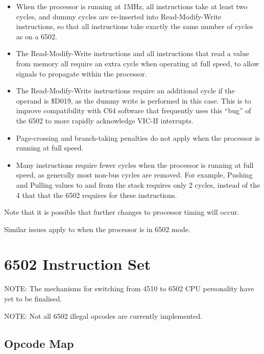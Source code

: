 \begin{itemize}
\item When the processor is running at 1MHz, all instructions take at least
  two cycles, and dummy cycles are re-inserted into Read-Modify-Write instructions,
  so that all instructions take exactly the same number of cycles as on a 6502.
\item The Read-Modify-Write instructions and all instructions that read a value from
  memory all require an extra cycle when operating at full speed, to allow signals
  to propagate within the processor.
\item The Read-Modify-Write instructions require an additional cycle if the operand
  is \$D019, as the dummy write is performed in this case.
  This is to improve compatibility with C64 software that frequently uses this
  ``bug'' of the 6502 to more rapidly acknowledge VIC-II interrupts.
\item Page-crossing and branch-taking penalties do not apply when the processor is
  running at full speed.
\item Many instructions require fewer cycles when the processor is running at full
  speed, as generally most non-bus cycles are removed. For example, Pushing and Pulling
  values to and from the stack requires only 2 cycles, instead of the 4 that that the
  6502 requires for these instructions.
\end{itemize}

Note that it is possible that further changes to processor timing will occur.

Similar issues apply to when the processor is in 6502 mode.
  
\begin{center}
\end{center}



\section{6502 Instruction Set}

NOTE: The mechanisms for switching from 4510 to 6502 CPU personality
have yet to be finalised.

NOTE: Not all 6502 illegal opcodes are currently implemented.

\subsection{Opcode Map}


